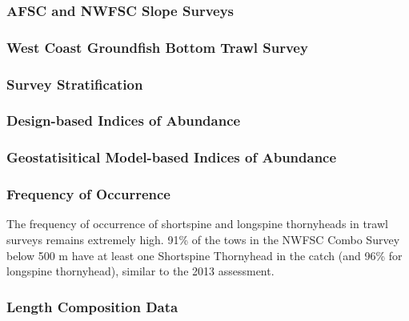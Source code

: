 \documentclass[11pt,
  english,
  letterpaper,
]{article}
\begin{document}
\hypertarget{afsc-and-nwfsc-slope-surveys}{%
\subsubsection{AFSC and NWFSC Slope Surveys}\label{afsc-and-nwfsc-slope-surveys}}

\hypertarget{west-coast-groundfish-bottom-trawl-survey}{%
\subsubsection{West Coast Groundfish Bottom Trawl Survey}\label{west-coast-groundfish-bottom-trawl-survey}}

\hypertarget{survey-stratification}{%
\subsubsection{Survey Stratification}\label{survey-stratification}}

\hypertarget{design-based-indices-of-abundance}{%
\subsubsection{Design-based Indices of Abundance}\label{design-based-indices-of-abundance}}

\hypertarget{geostatisitical-model-based-indices-of-abundance}{%
\subsubsection{Geostatisitical Model-based Indices of Abundance}\label{geostatisitical-model-based-indices-of-abundance}}

\hypertarget{frequency-of-occurrence}{%
\subsubsection{Frequency of Occurrence}\label{frequency-of-occurrence}}

The frequency of occurrence of shortspine and longspine thornyheads in trawl surveys remains extremely high. 91\% of the tows in the NWFSC Combo Survey below 500 m have at least one Shortspine Thornyhead in the catch (and 96\% for longspine thornyhead), similar to the 2013 assessment.

\hypertarget{length-composition-data}{%
\subsubsection{Length Composition Data}\label{length-composition-data}}
\end{document}
